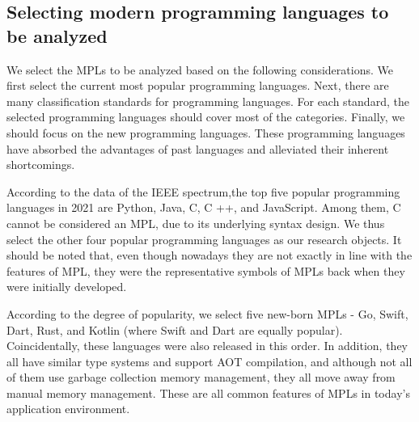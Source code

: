 \subsection{Selecting modern programming languages to be analyzed}

We select the MPLs to be analyzed based on the following considerations.
We first select the current most popular programming languages.
Next, there are many classification standards for programming languages.
For each standard, the selected programming languages should cover most of the categories.
Finally, we should focus on the new programming languages.
These programming languages have absorbed the advantages of past languages and
alleviated their inherent shortcomings.

According to the data of the IEEE spectrum,the top five popular programming
languages in 2021 are Python, Java, C, C ++, and JavaScript\cite{IEEETopProgrammingLanguages}.
Among them, C cannot be considered an MPL, due to its underlying syntax design.
We thus select the other four popular programming languages as our research objects.
It should be noted that, even though nowadays they are not exactly in line with the
features of MPL, they were the representative symbols of MPLs back when they
were initially developed.


According to the degree of popularity, we select five new-born MPLs -
Go, Swift, Dart, Rust, and Kotlin (where Swift and Dart are equally popular).
Coincidentally, these languages were also released in this order.
In addition, they all have similar type systems and support AOT compilation,
and although not all of them use garbage collection memory management,
they all move away from manual memory management.
These are all common features of MPLs in today’s application environment.

